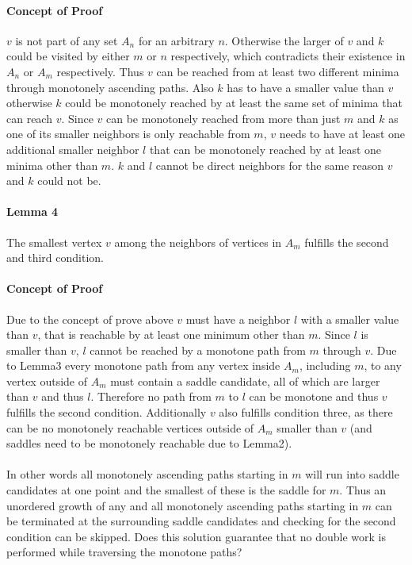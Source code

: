 \documentclass[%
	paper=A4,					%
	twoside=true,				%
	openright,					%
	parskip=full,				%
	chapterprefix=true,			%
	11pt,						%
	headings=normal,			%
	bibliography=totoc,			%
	listof=totoc,				%
	titlepage=on,				%
	captions=tableabove,		%
	draft=false,				%
]{scrreprt}%
\begin{document}
\paragraph{Concept of Proof}
\(v\) is not part of any set \(A_n\) for an arbitrary \(n\). Otherwise the larger of \(v\) and \(k\) could be visited by either \(m\) or \(n\) respectively, which contradicts their existence in \(A_n\) or \(A_m\) respectively. Thus \(v\) can be reached from at least two different minima through monotonely ascending paths. Also \(k\) has to have a smaller value than \(v\) otherwise \(k\) could be monotonely reached by at least the same set of minima that can reach \(v\). Since \(v\) can be monotonely reached from more than just \(m\) and \(k\) as one of its smaller neighbors is only reachable from \(m\), \(v\) needs to have at least one additional smaller neighbor \(l\) that can be monotonely reached by at least one minima other than \(m\). \(k\) and \(l\) cannot be direct neighbors for the same reason \(v\) and \(k\) could not be.

\paragraph{Lemma 4} The smallest vertex \(v\) among the neighbors of vertices in \(A_m\) fulfills the second and third condition.

\paragraph{Concept of Proof}
Due to the concept of prove above \(v\) must have a neighbor \(l\) with a smaller value than \(v\), that is reachable by at least one minimum other than \(m\). Since \(l\) is smaller than \(v\), \(l\) cannot be reached by a monotone path from \(m\) through \(v\). Due to Lemma3 every monotone path from any vertex inside \(A_m\), including \(m\), to any vertex outside of \(A_m\) must contain a saddle candidate, all of which are larger than \(v\) and thus \(l\). Therefore no path from \(m\) to \(l\) can be monotone and thus \(v\) fulfills the second condition. Additionally \(v\) also fulfills condition three, as there can be no monotonely reachable vertices outside of \(A_m\) smaller than \(v\) (and saddles need to be monotonely reachable due to Lemma2).

\paragraph{}
In other words all monotonely ascending paths starting in \(m\) will run into saddle candidates at one point and the smallest of these is the saddle for \(m\). Thus an unordered growth of any and all monotonely ascending paths starting in \(m\) can be terminated at the surrounding saddle candidates and checking for the second condition can be skipped. Does this solution guarantee that no double work is performed while traversing the monotone paths?
  
\end{document}
